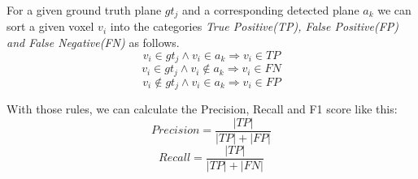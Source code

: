 \documentclass[main.tex]{subfiles}
\begin{document}
For a given ground truth plane $gt_j$ and a corresponding detected plane $a_k$ we can sort a given voxel $v_i$ into the categories
\textit{True Positive(TP), False Positive(FP) and False Negative(FN)} as follows.
$$v_i \in gt_j \land v_i \in a_k \Rightarrow v_{i} \in TP$$
$$v_i \in gt_j \land v_i \notin a_k \Rightarrow v_{i} \in FN$$
$$v_i \notin gt_j \land v_i \in a_k \Rightarrow v_{i} \in FP$$

With those rules, we can calculate the Precision, Recall and F1 score like this:
$$Precision = \frac{|TP|}{|TP|+|FP|}$$
$$Recall = \frac{|TP|}{|TP|+|FN|}$$
\end{document}
